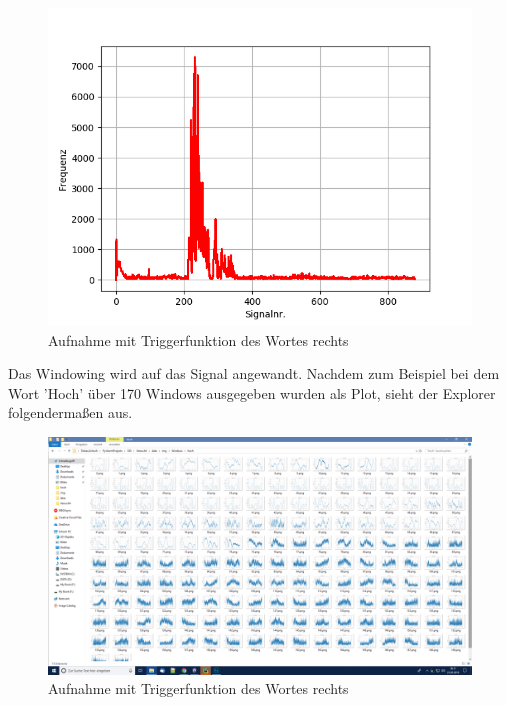 \documentclass[12pt, oneside, a4paper, \docLanguage]{report}
\begin{document}
\begin{figure}[H]
	\centering
	\includegraphics[width=.6\linewidth]{../data/img/AlleRichtig.png}
	\caption{Aufnahme mit Triggerfunktion des Wortes rechts}
	\label{img:Aufnahme mit Triggerfunktion des Wortes rechts}
\end{figure}
Das Windowing wird auf das Signal angewandt. Nachdem zum Beispiel bei dem Wort 'Hoch' über 170 Windows ausgegeben wurden als Plot, sieht der Explorer folgendermaßen aus.
\begin{figure}[H]
	\centering
	\includegraphics[width=.8\linewidth]{../data/img/window.png}
	\caption{Aufnahme mit Triggerfunktion des Wortes rechts}
	\label{img:Aufnahme mit Triggerfunktion des Wortes rechts}
\end{figure}
\newpage
\end{document}
